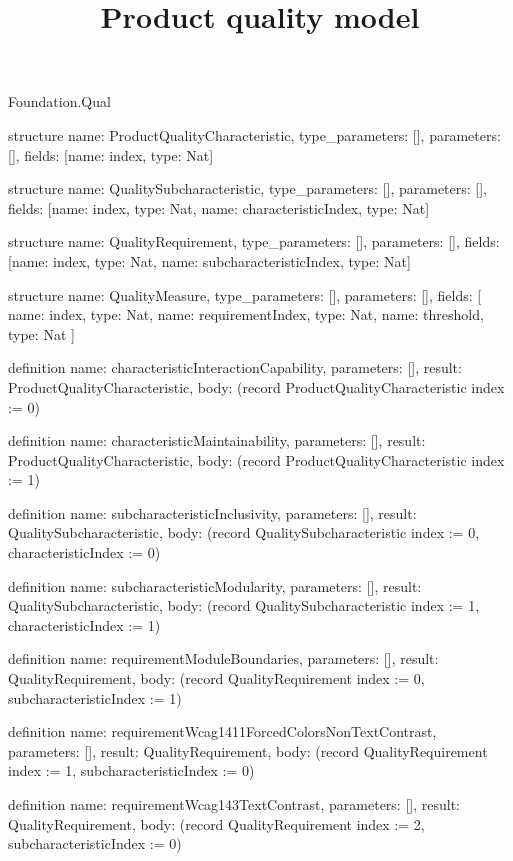 \begin{lexlean}{Foundation.Qual}
\title{Product quality model}
\begin{semanticmodule}
structure{
  name: ProductQualityCharacteristic,
  type_parameters: [],
  parameters: [],
  fields: [{name: index, type: Nat}]
}

structure{
  name: QualitySubcharacteristic,
  type_parameters: [],
  parameters: [],
  fields: [{name: index, type: Nat}, {name: characteristicIndex, type: Nat}]
}

structure{
  name: QualityRequirement,
  type_parameters: [],
  parameters: [],
  fields: [{name: index, type: Nat}, {name: subcharacteristicIndex, type: Nat}]
}

structure{
  name: QualityMeasure,
  type_parameters: [],
  parameters: [],
  fields: [
    {name: index, type: Nat},
    {name: requirementIndex, type: Nat},
    {name: threshold, type: Nat}
  ]
}

definition{
  name: characteristicInteractionCapability,
  parameters: [],
  result: ProductQualityCharacteristic,
  body: (record ProductQualityCharacteristic {index := 0})
}

definition{
  name: characteristicMaintainability,
  parameters: [],
  result: ProductQualityCharacteristic,
  body: (record ProductQualityCharacteristic {index := 1})
}

definition{
  name: subcharacteristicInclusivity,
  parameters: [],
  result: QualitySubcharacteristic,
  body: (record QualitySubcharacteristic {index := 0, characteristicIndex := 0})
}

definition{
  name: subcharacteristicModularity,
  parameters: [],
  result: QualitySubcharacteristic,
  body: (record QualitySubcharacteristic {index := 1, characteristicIndex := 1})
}

definition{
  name: requirementModuleBoundaries,
  parameters: [],
  result: QualityRequirement,
  body: (record QualityRequirement {index := 0, subcharacteristicIndex := 1})
}

definition{
  name: requirementWcag1411ForcedColorsNonTextContrast,
  parameters: [],
  result: QualityRequirement,
  body: (record QualityRequirement {index := 1, subcharacteristicIndex := 0})
}

definition{
  name: requirementWcag143TextContrast,
  parameters: [],
  result: QualityRequirement,
  body: (record QualityRequirement {index := 2, subcharacteristicIndex := 0})
}


\end{semanticmodule}
\end{lexlean}
